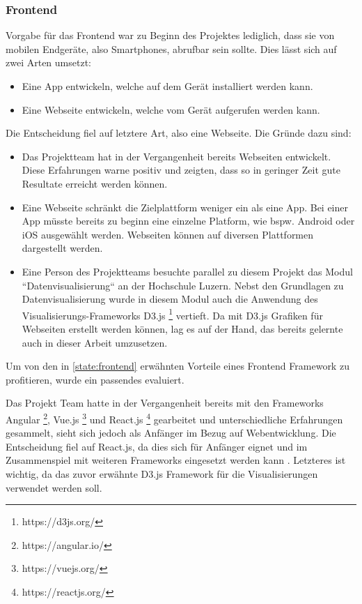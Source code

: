 \subsubsection{Frontend}
Vorgabe für das Frontend war zu Beginn des Projektes lediglich,
dass sie von mobilen Endgeräte, also Smartphones, abrufbar sein sollte.
Dies lässt sich auf zwei Arten umsetzt:
\begin{itemize}
    \item Eine App entwickeln, welche auf dem Gerät installiert werden kann.
    \item Eine Webseite entwickeln, welche vom Gerät aufgerufen werden kann.
\end{itemize}
Die Entscheidung fiel auf letztere Art, also eine Webseite.
Die Gründe dazu sind:
\begin{itemize}
    \item Das Projektteam hat in der Vergangenheit bereits Webseiten entwickelt.
          Diese Erfahrungen warne positiv und zeigten, dass so in geringer Zeit gute Resultate erreicht werden können.
    \item Eine Webseite schränkt die Zielplattform weniger ein als eine App.
          Bei einer App müsste bereits zu beginn eine einzelne Platform, wie bspw. Android oder iOS ausgewählt werden.
          Webseiten können auf diversen Plattformen dargestellt werden.
    \item Eine Person des Projektteams besuchte parallel zu diesem Projekt das Modul ``Datenvisualisierung``  an der Hochschule Luzern.
          Nebst den Grundlagen zu Datenvisualisierung wurde in diesem Modul auch die Anwendung des Visualisierungs-Frameworks D3.js \footnote{https://d3js.org/} vertieft.
          Da mit D3.js Grafiken für Webseiten erstellt werden können, lag es auf der Hand, das bereits gelernte auch in dieser Arbeit umzusetzen.
\end{itemize}

Um von den in \ref{state:frontend} erwähnten Vorteile eines Frontend Framework zu profitieren,
wurde ein passendes evaluiert.

Das Projekt Team hatte in der Vergangenheit bereits mit den Frameworks Angular \footnote{https://angular.io/}, Vue.js \footnote{https://vuejs.org/} und React.js \footnote{https://reactjs.org/} gearbeitet
und unterschiedliche Erfahrungen gesammelt, sieht sich jedoch als Anfänger im Bezug auf Webentwicklung.
Die Entscheidung fiel auf React.js, da dies sich für Anfänger eignet und im Zusammenspiel mit weiteren Frameworks eingesetzt werden kann \parencite{react_angular_vue}.
Letzteres ist wichtig, da das zuvor erwähnte D3.js Framework für die Visualisierungen verwendet werden soll.

